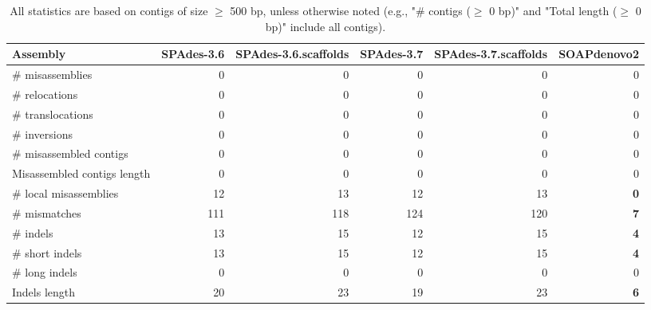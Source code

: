 \documentclass[12pt,a4paper]{article}
\begin{document}
\begin{table}[ht]
\begin{center}
\caption{All statistics are based on contigs of size $\geq$ 500 bp, unless otherwise noted (e.g., "\# contigs ($\geq$ 0 bp)" and "Total length ($\geq$ 0 bp)" include all contigs).}
\begin{tabular}{|l*{5}{|r}|}
\hline
Assembly & SPAdes-3.6 & SPAdes-3.6.scaffolds & SPAdes-3.7 & SPAdes-3.7.scaffolds & SOAPdenovo2 \\ \hline
\# misassemblies & 0 & 0 & 0 & 0 & 0 \\ \hline
\hspace{5mm}\# relocations & 0 & 0 & 0 & 0 & 0 \\ \hline
\hspace{5mm}\# translocations & 0 & 0 & 0 & 0 & 0 \\ \hline
\hspace{5mm}\# inversions & 0 & 0 & 0 & 0 & 0 \\ \hline
\# misassembled contigs & 0 & 0 & 0 & 0 & 0 \\ \hline
Misassembled contigs length & 0 & 0 & 0 & 0 & 0 \\ \hline
\# local misassemblies & 12 & 13 & 12 & 13 & {\bf 0} \\ \hline
\# mismatches & 111 & 118 & 124 & 120 & {\bf 7} \\ \hline
\# indels & 13 & 15 & 12 & 15 & {\bf 4} \\ \hline
\hspace{5mm}\# short indels & 13 & 15 & 12 & 15 & {\bf 4} \\ \hline
\hspace{5mm}\# long indels & 0 & 0 & 0 & 0 & 0 \\ \hline
Indels length & 20 & 23 & 19 & 23 & {\bf 6} \\ \hline
\end{tabular}
\end{center}
\end{table}
\end{document}
